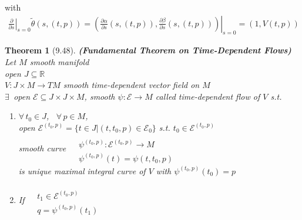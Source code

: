 \documentclass[11pt]{amsart}
\newtheorem{theorem}{Theorem}
\theoremstyle{definition}
\begin{document}
with \[
\begin{gathered}
\left. \frac{ \partial }{ \partial s}\right|_{s=0} \widetilde{\theta}( s,(t,p)) = \left. \left( \frac{ \partial \alpha }{\partial s}(s,(t,p)), \frac{\partial \beta}{ \partial s}(s,(t,p))  \right)\right|_{s=0} = (1, V(t,p))
\end{gathered}
\]


\begin{theorem}[9.48] \textbf{(Fundamental Theorem on Time-Dependent Flows)} \\
Let $M$ smooth manifold \\
open $J \subseteq \mathbb{R}$ \\
$V: J \times M \to TM$ smooth time-dependent vector field on $M$ \\
$\exists \, $ open $\mathcal{E} \subseteq J\times J \times M$, smooth $\psi : \mathcal{E} \to M$ called time-dependent flow of $V$ s.t.

\begin{enumerate}
\item[(a)] $\forall \, t_0 \in J$, \, $\forall \, p \in M$, \\
open $\mathcal{E}^{(t_0,p)} = \lbrace t \in J | (t,t_0, p) \in \mathcal{E}_0 \rbrace$ s.t. $t_0 \in \mathcal{E}^{(t_0, p)}$ \\
smooth curve $\begin{aligned}
  & \quad \\
  & \psi^{(t_0,p)}: \mathcal{E}^{(t_0,p)} \to M \\
  & \psi^{(t_0,p)}(t) = \psi(t,t_0,p) \end{aligned}$ \\
is unique maximal integral curve of $V$ with $\psi^{(t_0,p)}(t_0) = p$
\item[(b)] If $ \begin{aligned}
  & \quad \\
  & t_1 \in \mathcal{E}^{(t_0,p)} \\
  & q = \psi^{(t_0,p)}(t_1) \end{aligned}$


\end{enumerate}
\end{theorem}
\end{document}

